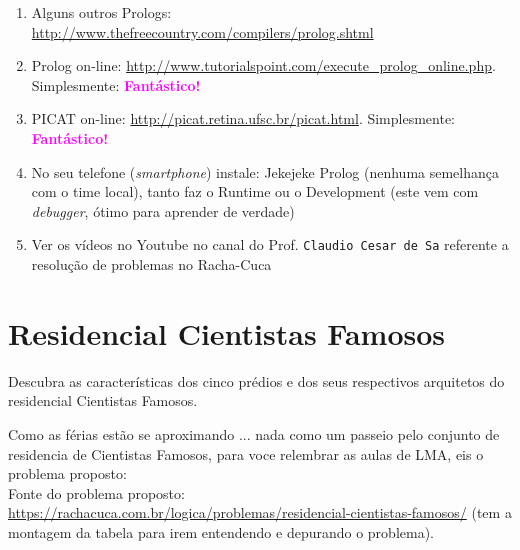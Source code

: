 \documentclass[a4paper,12pt]{article}
\begin{document}
\begin{enumerate}


\item Alguns outros Prologs:  \url{http://www.thefreecountry.com/compilers/prolog.shtml}

\item Prolog on-line: \url{http://www.tutorialspoint.com/execute_prolog_online.php}. Simplesmente: \textbf{\textcolor{magenta}{Fantástico!}}

\item PICAT on-line: \url{http://picat.retina.ufsc.br/picat.html}. Simplesmente: \textbf{\textcolor{magenta}{Fantástico!}}



 \item No seu telefone (\emph{smartphone}) instale: Jekejeke Prolog (nenhuma semelhança com o time local), tanto faz o Runtime ou o Development (este vem com 
 \emph{debugger}, ótimo para aprender de verdade)
 
 \item Ver os vídeos no Youtube no canal do Prof. \texttt{Claudio Cesar de Sa} referente
 a resolução de problemas no Racha-Cuca

\end{enumerate}





\newpage
\tableofcontents


\newpage
\section{Residencial Cientistas Famosos}


Descubra as características dos cinco prédios e dos seus 
respectivos arquitetos do residencial Cientistas Famosos.

Como as férias estão se aproximando ... nada como um passeio
pelo conjunto de residencia de Cientistas Famosos, 
 para voce 
relembrar as aulas de LMA, eis o problema proposto:\\
 Fonte do problema proposto:\\
 \url{https://rachacuca.com.br/logica/problemas/residencial-cientistas-famosos/}
 (tem a montagem da tabela para irem entendendo e depurando o problema).\\
\end{document}
